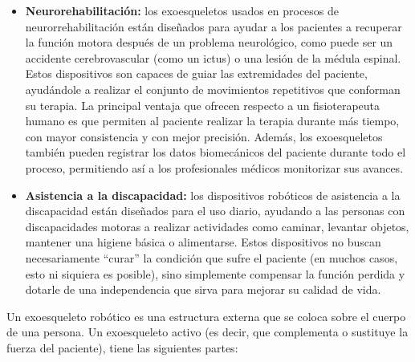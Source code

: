 \documentclass[10pt,a4paper,spanish]{article}
\begin{document}
\begin{itemize}
    \item \textbf{Neurorehabilitación:} los exoesqueletos usados en procesos de neurorrehabilitación están diseñados para ayudar a los pacientes a recuperar la función motora después de un problema neurológico, como puede ser un accidente cerebrovascular (como un ictus) o una lesión de la médula espinal. Estos dispositivos son capaces de guiar las extremidades del paciente, ayudándole a realizar el conjunto de movimientos repetitivos que conforman su terapia. La principal ventaja que ofrecen respecto a un fisioterapeuta humano es que permiten al paciente realizar la terapia durante más tiempo, con mayor consistencia y con mejor precisión. Además, los exoesqueletos también pueden registrar los datos biomecánicos del paciente durante todo el proceso, permitiendo así a los profesionales médicos monitorizar sus avances.
    \item \textbf{Asistencia a la discapacidad:} los dispositivos robóticos de asistencia a la discapacidad están diseñados para el uso diario, ayudando a las personas con discapacidades motoras a realizar actividades como caminar, levantar objetos, mantener una higiene básica o alimentarse. Estos dispositivos no buscan necesariamente ``curar'' la condición que sufre el paciente (en muchos casos, esto ni siquiera es posible), sino simplemente compensar la función perdida y dotarle de una independencia que sirva para mejorar su calidad de vida.
\end{itemize}

Un exoesqueleto robótico es una estructura externa que se coloca sobre el cuerpo de una persona. Un exoesqueleto activo (es decir, que complementa o sustituye la fuerza del paciente), tiene las siguientes partes:
\end{document}
